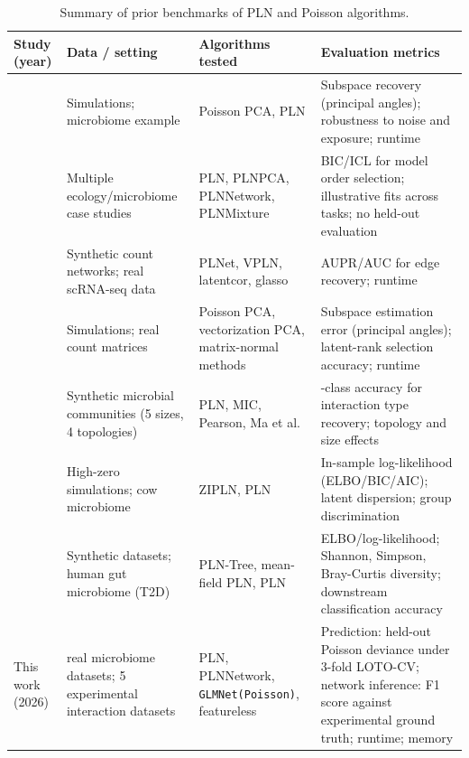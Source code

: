 \documentclass[Review,doublespace,sageh,times]{sagej}
\begin{document}
\begin{table}[htbp]
\caption{Summary of prior benchmarks of PLN and Poisson algorithms.}
\centering
\footnotesize
\setlength{\tabcolsep}{3pt}
\begin{tabular}{>{\raggedright\arraybackslash}p{2.5cm}>{\raggedright\arraybackslash}p{3.2cm}>{\raggedright\arraybackslash}p{3.2cm}>{\raggedright\arraybackslash}p{4.1cm}}
\toprule
Study (year) & Data / setting & Algorithms tested & Evaluation metrics \\
\midrule
\citet{Kenney2021PoissonPCA} & Simulations; microbiome example & Poisson PCA, PLN & Subspace recovery (principal angles); robustness to noise and exposure; runtime \\
\midrule
\citet{Chiquet2021} & Multiple ecology/microbiome case studies & PLN, PLNPCA, PLNNetwork, PLNMixture & BIC/ICL for model order selection; illustrative fits across tasks; no held-out evaluation \\
\midrule
\citet{Xiao2022PLNet} & Synthetic count networks; real scRNA-seq data & PLNet, VPLN, latentcor, glasso & AUPR/AUC for edge recovery; runtime \\
\midrule
\citet{Virta2023PoissonPCA} & Simulations; real count matrices & Poisson PCA, vectorization PCA, matrix-normal methods & Subspace estimation error (principal angles); latent-rank selection accuracy; runtime \\
\midrule
\citet{Qian2024} & Synthetic microbial communities (5 sizes, 4 topologies) & PLN, MIC, Pearson, Ma et al. & 3-class accuracy for interaction type recovery; topology and size effects \\
\midrule
\citet{Batardiere2025ZIPLN} & High-zero simulations; cow microbiome & ZIPLN, PLN & In-sample log-likelihood (ELBO/BIC/AIC); latent dispersion; group discrimination \\
\midrule
\citet{Chaussard2025PLNTree} & Synthetic datasets; human gut microbiome (T2D) & PLN-Tree, mean-field PLN, PLN & ELBO/log-likelihood; Shannon, Simpson, Bray-Curtis diversity; downstream classification accuracy \\
\midrule
This work (2026) & 20 real microbiome datasets; 5 experimental interaction datasets & PLN, PLNNetwork, \texttt{GLMNet(Poisson)}, featureless & Prediction: held-out Poisson deviance under 3-fold LOTO-CV; network inference: F1 score against experimental ground truth; runtime; memory \\
\bottomrule
\end{tabular}
\label{tab:related_work}
\end{table}
\end{document}
